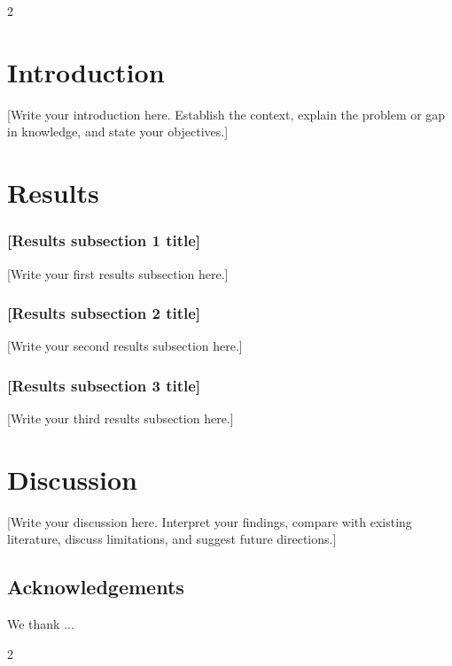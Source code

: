 \documentclass[11pt, a4paper]{article}
\begin{document}
\linenumbers
\begin{multicols*}{2}

\setlength{\parindent}{0pt}
\section*{Introduction}

[Write your introduction here. Establish the context, explain the problem or gap in knowledge, and state your objectives.]



\section*{Results}

\subsubsection{[Results subsection 1 title]}

[Write your first results subsection here.]



\subsubsection{[Results subsection 2 title]}

[Write your second results subsection here.]



\subsubsection{[Results subsection 3 title]}

[Write your third results subsection here.]




\section*{Discussion}

[Write your discussion here. Interpret your findings, compare with existing literature, discuss limitations, and suggest future directions.]


\subsection*{Acknowledgements}

We thank ...
\end{multicols*}


\clearpage
\begin{multicols*}{2}


\printbibliography


\setcounter{figure}{0}


\end{multicols*}
\end{document}
